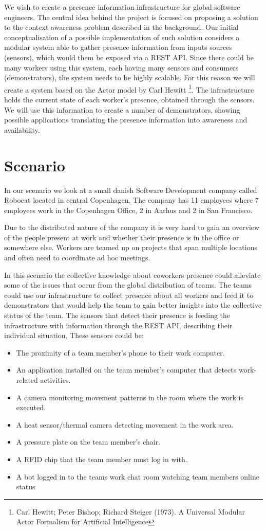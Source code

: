 \documentclass{sigchi}
\begin{document}
We wish to create a presence information infrastructure for global software engineers. The central idea behind the project is focused on proposing a solution to the context awareness problem described in the background. Our initial conceptualisation of a possible implementation of such solution considers a modular system able to gather presence information from inputs sources (sensors), which would them be exposed via a REST API.
Since there could be many workers using this system, each having many sensors and consumers (demonstrators), the system needs to be highly scalable. For this reason we will create a system based on the Actor model by Carl Hewitt \footnote{Carl Hewitt; Peter Bishop; Richard Steiger (1973). A Universal Modular Actor Formalism for Artificial Intelligence}.
The infrastructure holds the current state of each worker's presence, obtained through the sensors. We will use this information to create a number of demonstrators, showing possible applications translating the presence information into awareness and availability.

\section{Scenario}

In our scenario we look at a small danish Software Development company called Robocat located in central Copenhagen. The company has 11 employees where 7 employees work in the Copenhagen Office, 2 in Aarhus and 2 in San Francisco.

Due to the distributed nature of the company it is very hard to gain an overview of the people present at work and whether their presence is in the office or somewhere else. Workers are teamed up on projects that span multiple locations and often need to coordinate ad hoc meetings.

In this scenario the collective knowledge about coworkers presence could alleviate some of the issues that occur from the global distribution of teams. The teams could use our infrastructure to collect presence about all workers and feed it to demonstrators that would help the team to gain better insights into the collective status of the team. The sensors that detect their presence is feeding the infrastructure with information through the REST API, describing their individual situation. These sensors could be:
\begin{itemize}
\item The proximity of a team member’s phone to their work computer.
\item An application installed on the team member’s computer that detects work-related activities.
\item A camera monitoring movement patterns in the room where the work is executed.
\item A heat sensor/thermal camera detecting movement in the work area.
\item A pressure plate on the team member’s chair.
\item A RFID chip that the team member must log in with.
\item A bot logged in to the teams work chat room watching team members online status
\end{itemize}
\end{document}
